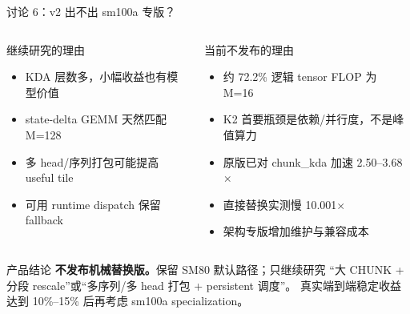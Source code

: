\documentclass[aspectratio=169,10pt]{beamer}
\begin{document}
\begin{frame}{讨论 6：v2 出不出 sm100a 专版？}
  \begin{columns}[T,onlytextwidth]
      \begin{block}{继续研究的理由}
        \begin{itemize}
          \item KDA 层数多，小幅收益也有模型价值
          \item state-delta GEMM 天然匹配 M=128
          \item 多 head/序列打包可能提高 useful tile
          \item 可用 runtime dispatch 保留 fallback
        \end{itemize}
      \end{block}
      \begin{block}{当前不发布的理由}
        \begin{itemize}
          \item 约 72.2\% 逻辑 tensor FLOP 为 M=16
          \item K2 首要瓶颈是依赖/并行度，不是峰值算力
          \item 原版已对 chunk\_kda 加速 2.50--3.68$\times$
          \item 直接替换实测慢 10.001$\times$
          \item 架构专版增加维护与兼容成本
        \end{itemize}
      \end{block}
  \end{columns}

  \vspace{0.4em}
  \begin{alertblock}{产品结论}
    \textbf{不发布机械替换版。}保留 SM80 默认路径；只继续研究
    “大 CHUNK + 分段 rescale”或“多序列/多 head 打包 + persistent 调度”。
    真实端到端稳定收益达到 10\%--15\% 后再考虑 sm100a specialization。
  \end{alertblock}

\end{frame}
\end{document}
